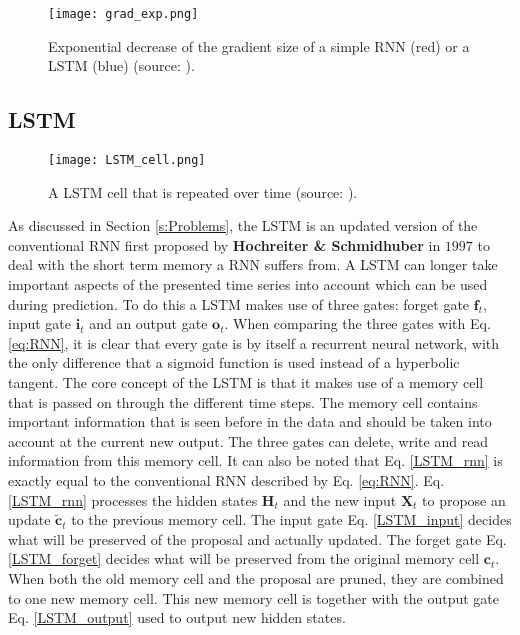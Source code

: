 \begin{figure}[h!]
	\centering
	\texttt{[image: grad\_exp.png]}
	\caption{Exponential decrease of the gradient size of a simple RNN (red) or a LSTM (blue) (source: \cite{Teuwen2019}).}
	\label{fig:grad_exp}
\end{figure}

\newpage
\subsection{LSTM}\label{s:LSTM}

\begin{figure}[ht]
	\centering
	\texttt{[image: LSTM\_cell.png]}
	\caption{A LSTM cell that is repeated over time (source: \cite{Olah}).}
	\label{fig:LSTM_cell}
\end{figure}

As discussed in Section \ref{s:Problems}, the LSTM is an updated version of the conventional RNN first proposed by \textbf{Hochreiter \& Schmidhuber} in $ 1997 $ to deal with the short term memory a RNN suffers from. A LSTM can longer take important aspects of the presented time series into account which can be used during prediction. To do this a LSTM makes use of three gates: forget gate $ \textbf{f}_t $, input gate $ \textbf{i}_t $ and an output gate $ \textbf{o}_t $. When comparing the three gates with Eq. \ref{eq:RNN}, it is clear that every gate is by itself a recurrent neural network, with the only difference that a sigmoid function is used instead of a hyperbolic tangent. The core concept of the LSTM is that it makes use of a memory cell that is passed on through the different time steps. The memory cell contains important information that is seen before in the data and should be taken into account at the current new output. The three gates can delete, write and read information from this memory cell. It can also be noted that Eq. \ref{LSTM_rnn} is exactly equal to the conventional RNN described by Eq. \ref{eq:RNN}. Eq. \ref{LSTM_rnn} processes the hidden states $ \bm{H}_t $ and the new input $ \bm{X}_t $ to propose an update $ \tilde{\textbf{c}}_t $ to the previous memory cell. The input gate Eq. \ref{LSTM_input} decides what will be preserved of the proposal and actually updated. The forget gate Eq. \ref{LSTM_forget} decides what will be preserved from the original memory cell $ \textbf{c}_t $. When both the old memory cell and the proposal are pruned, they are combined to one new memory cell. This new memory cell is together with the output gate Eq. \ref{LSTM_output} used to output new hidden states. \\

